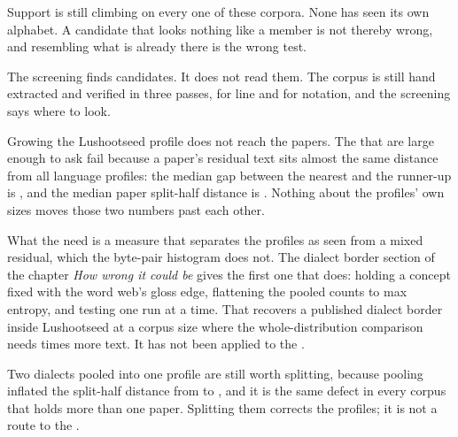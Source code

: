 Support is still climbing on every one of these corpora. None has seen its own alphabet. A candidate that looks nothing like a member is not thereby wrong, and resembling what is already there is the wrong test.

The screening finds candidates. It does not read them. The corpus is still hand extracted and verified in three passes, for line and for notation, and the screening says where to look.

Growing the Lushootseed profile does not reach the \GoldPapersNotRead{} papers. The \GoldPapersUnread{} that are large enough to ask fail because a paper's residual text sits almost the same distance from all \GoldLanguages{} language profiles: the median gap between the nearest and the runner-up is \GoldMedianGap{}, and the median paper split-half distance is \GoldMedianSplit{}. Nothing about the profiles' own sizes moves those two numbers past each other.

What the \GoldPapersUnread{} need is a measure that separates the profiles as seen from a mixed residual, which the byte-pair histogram does not. The dialect border section of the chapter \emph{How wrong it could be} gives the first one that does: holding a concept fixed with the word web's gloss edge, flattening the pooled counts to max entropy, and testing one run at a time. That recovers a published dialect border inside Lushootseed at a corpus size where the whole-distribution comparison needs \BorderNeeds{} times more text. It has not been applied to the \GoldPapersUnread{}.

Two dialects pooled into one profile are still worth splitting, because pooling inflated the split-half distance from \GoldUnreadAlternating{} to \GoldUnreadSplit{}, and it is the same defect in every corpus that holds more than one paper. Splitting them corrects the profiles; it is not a route to the \GoldPapersUnread{}.

